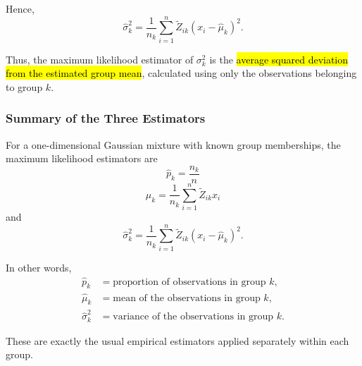 Hence,
\begin{equation*}
\boxed{
\hat{\sigma}_k^2
=
\frac{1}{n_k}
\sum_{i=1}^n
\tilde{Z}_{ik}(x_i-\hat{\mu}_k)^2
}.
\end{equation*}

Thus, the maximum likelihood estimator of $\sigma_k^2$ is the
\hl{average squared deviation from the estimated group mean},
calculated using only the observations belonging to group $k$.

\subsubsection*{Summary of the Three Estimators}

For a one-dimensional Gaussian mixture with known group memberships,
the maximum likelihood estimators are
\begin{equation*}
\boxed{
\hat{p}_k
=
\frac{n_k}{n}
}
\end{equation*}
\begin{equation*}
\boxed{
\hat{\mu}_k
=
\frac{1}{n_k}
\sum_{i=1}^n
\tilde{Z}_{ik}x_i
}
\end{equation*}
and
\begin{equation*}
\boxed{
\hat{\sigma}_k^2
=
\frac{1}{n_k}
\sum_{i=1}^n
\tilde{Z}_{ik}(x_i-\hat{\mu}_k)^2
}.
\end{equation*}

In other words,
\begin{equation*}
\boxed{
\begin{aligned}
\hat{p}_k
&=\text{proportion of observations in group }k,\\[2mm]
\hat{\mu}_k
&=\text{mean of the observations in group }k,\\[2mm]
\hat{\sigma}_k^2
&=\text{variance of the observations in group }k.
\end{aligned}
}
\end{equation*}

These are exactly the usual empirical estimators applied separately
within each group.